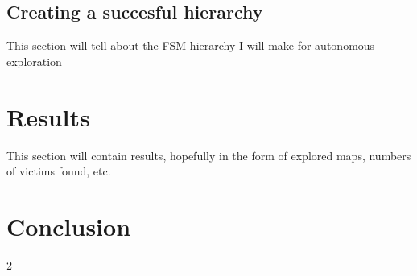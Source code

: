 \documentclass[a4paper,10pt]{article}
\begin{document}
\begin{multicols}{2}
\subsection{Creating a succesful hierarchy}
This section will tell about the FSM hierarchy I will make for autonomous
exploration


\section{Results}
This section will contain results, hopefully in the form of explored maps, numbers of victims found, etc.

\section{Conclusion}

\end{multicols}{2}
{}

\end{document}
